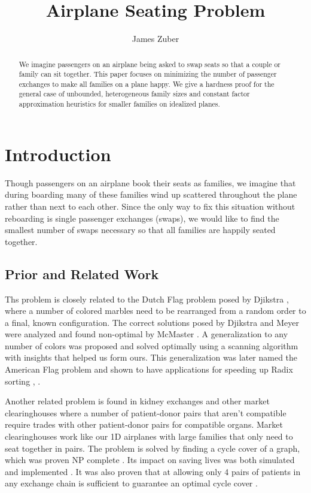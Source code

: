 \documentclass[a4paper]{article}
\title{Airplane Seating Problem}
\author{James Zuber}
\begin{document}

\maketitle

\begin{abstract}
We imagine passengers on an airplane being asked to swap seats so that a couple or family can sit together.  This paper focuses on minimizing the number of passenger exchanges to make all families on a plane happy.  We give a hardness proof for the general case of unbounded, heterogeneous family sizes and constant factor approximation heuristics for smaller families on idealized planes.
\end{abstract}

\section{Introduction}
Though passengers on an airplane book their seats as families, we imagine that during boarding many of these families wind up scattered throughout the plane rather than next to each other.  Since the only way to fix this situation without reboarding is single passenger exchanges (swaps), we would like to find the smallest number of swaps necessary so that all families are happily seated together.

\subsection{Prior and Related Work}

Ths problem is closely related to the Dutch Flag problem posed by Djikstra \cite{dijkstra1976discipline}, where a number of colored marbles need to be rearranged from a random order to a final, known configuration.  The correct solutions posed by Djikstra and Meyer were analyzed and found non-optimal by McMaster \cite{mcMaster1978analysis}.  A generalization to any number of colors was proposed and solved optimally \cite{bitner1982asymptotically} using a scanning algorithm with insights that helped us form ours.  This generalization was later named the American Flag problem and shown to have applications for speeding up Radix sorting \cite{mcllroy1993engineering}, \cite{al2005formulation}.

Another related problem is found in kidney exchanges and other market clearinghouses where a number of patient-donor pairs that aren't compatible require trades with other patient-donor pairs for compatible organs.  Market clearinghouses work like our 1D airplanes with large families that only need to seat together in pairs.  The problem is solved by finding a cycle cover of a graph, which was proven NP complete \cite{abraham2007clearing}.  Its impact on saving lives was both simulated \cite{roth2004kidney} and implemented \cite{abraham2007clearing}.  It was also proven that at allowing only 4 pairs of patients in any exchange chain is sufficient to guarantee an optimal cycle cover \cite{roth2007efficient}.
\end{document}
